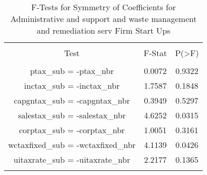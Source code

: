 
\begin{table}[!htbp] \centering 
  \caption{F-Tests for Symmetry of Coefficients for Administrative and support and waste management and remediation serv Firm Start Ups} 
  \label{56Ftests} 
\begin{tabular}{@{\extracolsep{5pt}} ccc} 
\\[-1.8ex]\hline 
\hline \\[-1.8ex] 
Test & F-Stat & P(\textgreater F) \\ 
\hline \\[-1.8ex] 
ptax\_sub = -ptax\_nbr & 0.0072 & 0.9322 \\ 
inctax\_sub = -inctax\_nbr & 1.7587 & 0.1848 \\ 
capgntax\_sub = -capgntax\_nbr & 0.3949 & 0.5297 \\ 
salestax\_sub = -salestax\_nbr & 4.6252 & 0.0315 \\ 
corptax\_sub = -corptax\_nbr & 1.0051 & 0.3161 \\ 
wctaxfixed\_sub = -wctaxfixed\_nbr & 4.1139 & 0.0426 \\ 
uitaxrate\_sub = -uitaxrate\_nbr & 2.2177 & 0.1365 \\ 
\hline \\[-1.8ex] 
\end{tabular} 
\end{table} 
